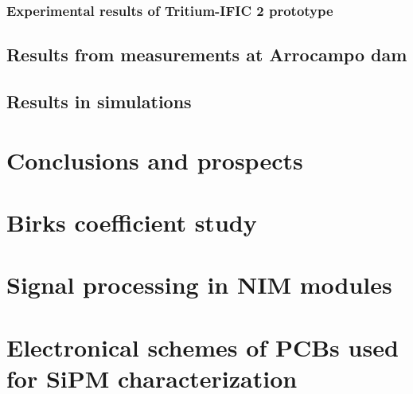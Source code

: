 \documentclass[12pt,a4paper]{book}
\begin{document}
		\subsection{Experimental results of Tritium-IFIC 2 prototype}\label{subsec:ResultsTritiumIFIC2}
		
		\newpage
		
	\section[Results in Arrocampo dam]{Results from measurements at Arrocampo dam}\label{sec:ResultsArrocampo}
	
	\newpage
	
	\section{Results in simulations}\label{sec:ResultsSimulations}
	
	\newpage		

\chapter{Conclusions and prospects}  \label{chap:Conclusions}

\newpage


\appendix
\appendixpage
\noappendicestocpagenum
\addappheadtotoc

\chapter{Birks coefficient study}\label{App:BirksA}


\chapter{Signal processing in NIM modules}\label{App:ElectronicModulesNIM}


\chapter{Electronical schemes of PCBs used for SiPM characterization}\label{App:ElectronicalSchemesSiPMPCBs}

\end{document}
